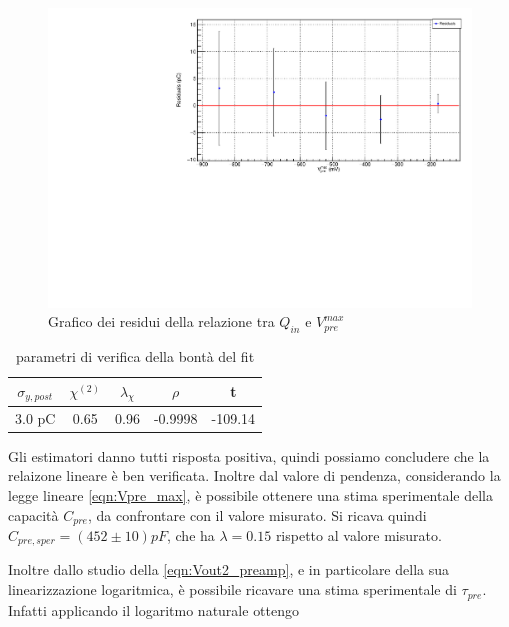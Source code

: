 \documentclass{article}
\begin{document}
\begin{center}
\begin{figure}[H]
\centering
\includegraphics[scale=0.4, angle=0]{residuipreamp.pdf}
\caption{Grafico dei residui della relazione tra $Q_{in}$ e $V_{pre}^{max}$}
\label{fig:QinvsVpre_res}
\end{figure}
\end{center}

\begin{table}[ht]
    \centering
    \begin{tabular}{ccccc}
        \toprule
        $\sigma_{y, post}$    &$\chi^{(2)}$    &$\lambda_{\chi}$   &$\rho$ &t      \\
        \midrule
        3.0 pC                  &0.65            &0.96               &-0.9998&-109.14\\
        \bottomrule
    \end{tabular}
    \caption{parametri di verifica della bontà del fit}
\end{table}

Gli estimatori danno tutti risposta positiva, quindi possiamo concludere che la relaizone lineare è ben verificata.
Inoltre dal valore di pendenza, considerando la legge lineare \ref{eqn:Vpre_max}, è possibile ottenere una stima sperimentale della capacità $C_{pre}$, 
da confrontare con il valore misurato. Si ricava quindi $C_{pre,sper} = (452\pm 10)pF$, che ha $\lambda = 0.15 $ rispetto al valore misurato.

Inoltre dallo studio della \ref{eqn:Vout2_preamp}, e in particolare della sua linearizzazione logaritmica, è possibile ricavare
una stima sperimentale di $\tau_{pre}$. Infatti applicando il logaritmo naturale ottengo
\end{document}
